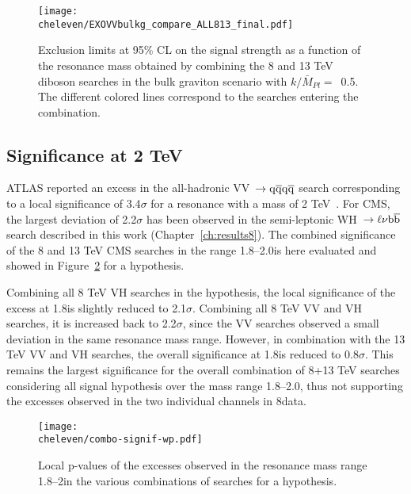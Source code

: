 \begin{figure}[!htb]
\centering
\texttt{[image: \\cheleven/EXOVVbulkg\_compare\_ALL813\_final.pdf]}
\caption{
Exclusion limits at 95\% CL on the signal strength as a function of the resonance mass obtained by combining the 8 and 13 TeV diboson searches in the bulk graviton scenario with $k/\bar{M}_{Pl}=$~0.5. The different colored lines correspond to the searches entering the combination.}
\label{fig:bulkgall_138TeV}
\end{figure}

\subsection{Significance at 2 TeV}

ATLAS reported an excess in the all-hadronic VV~$\to\mathrm{q}\overline{\mathrm{q}}\mathrm{q}\overline{\mathrm{q}}$ search corresponding to a local significance of 3.4$\sigma$ for a \Wpr resonance with a mass of 2 TeV~\cite{Aad:2015owa}.
For CMS, the largest deviation of 2.2$\sigma$ has been observed in the semi-leptonic WH~$\to \ell \nu {\mathrm{b}\overline{\mathrm{b}}}$ search described in this work (Chapter~\ref{ch:results8}).
The combined significance of the 8 and 13 TeV CMS searches in the range 1.8--2.0\TeV is here evaluated and showed in Figure~\ref{fig:comboSignif} for a \Wpr hypothesis.

Combining all 8 TeV VH searches in the \Wpr hypothesis, the local significance of the excess at 1.8\TeV is slightly reduced to 2.1$\sigma$.
Combining all 8 TeV VV and VH searches, it is increased back to 2.2$\sigma$, since the VV searches observed a small deviation in the same resonance mass range.
However, in combination with the 13 TeV VV and VH searches, the overall significance at 1.8\TeV is reduced to 0.8$\sigma$.
This remains the largest significance for the overall combination of 8+13 TeV searches considering all signal hypothesis over the mass range 1.8--2.0\TeV,
thus not supporting the excesses observed in the two individual channels in 8\TeV data.

\begin{figure}[!htb]
\centering
\texttt{[image: \\cheleven/combo-signif-wp.pdf]}
\caption{Local p-values of the excesses observed in the resonance mass range 1.8--2\TeV in the various combinations of searches for a \Wpr hypothesis.}
\label{fig:comboSignif}
\end{figure}

